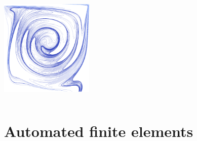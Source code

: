 \documentclass[presentation,aspectratio=43, 10pt]{beamer}
\begin{document}
\begin{frame}
\begin{columns}
\begin{column}{0.4\textwidth}
      \includegraphics[width=0.333\textwidth]{../pictures/mhd/ldc_5000_5000_B}%
    \end{column}
  \end{columns}
\end{frame}

\section{Automated finite elements}
\end{document}
